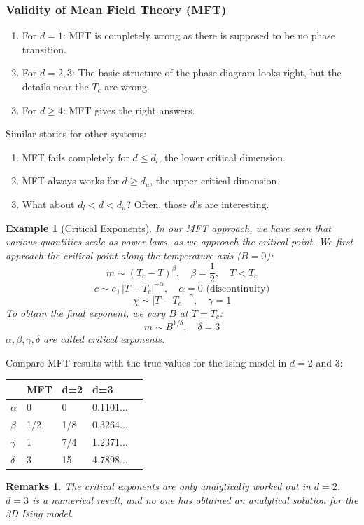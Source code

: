 \documentclass[a4paper]{article}
\newtheorem{remarks}{Remarks}[section]
\newtheorem{eg}{Example}[section]
\theoremstyle{new}
\begin{document}
\subsubsection{Validity of Mean Field Theory (MFT)}
\begin{enumerate}
    \item For $d=1$: MFT is completely wrong as there is supposed to be no phase transition.
    \item For $d=2,3$: The basic structure of the phase diagram looks right, but the details near the $T_c$ are wrong.
    \item For $d\geq4$: MFT gives the right answers.
\end{enumerate}
Similar stories for other systems:
\begin{enumerate}
    \item MFT fails completely for $d\leq d_l$, the lower critical dimension.
    \item MFT always works for $d\geq d_u$, the upper critical dimension.
    \item What about $d_l<d<d_u$? Often, those $d$'s are interesting.
\end{enumerate}
\begin{eg}[Critical Exponents]
In our MFT approach, we have seen that various quantities scale as power laws, as we approach the critical point. We first approach the critical point along the temperature axis ($B=0$):
$$m\sim(T_c-T)^\beta,\quad\beta=\frac{1}{2},\quad T<T_c$$
$$c\sim c_\pm|T-T_c|^{-\alpha},\quad\alpha=0\text{ (discontinuity)}$$
$$\chi\sim|T-T_c|^{-\gamma},\quad\gamma=1$$
To obtain the final exponent, we vary $B$ at $T=T_c$:
$$m\sim B^{1/\delta},\quad\delta=3$$
$\alpha,\beta,\gamma,\delta$ are called critical exponents.
\end{eg}
Compare MFT results with the true values for the Ising model in $d=2$ and 3:
\begin{table}[H]
\centering
\begin{tabular}{|l|l|l|l|l|}
\hline
      & MFT & d=2 & d=3         \\
      \hline
$\alpha$ & 0   & 0   & 0.1101...   \\
 \hline
$\beta$  & 1/2 & 1/8 & 0.3264...   \\
 \hline
$\gamma$ & 1   & 7/4 & 1.2371...   \\
 \hline
$\delta$ & 3   & 15  & 4.7898...  \\
\hline
\end{tabular}
\end{table}
\begin{remarks}
The critical exponents are only analytically worked out in $d=2$. $d=3$ is a numerical result, and no one has obtained an analytical solution for the 3D Ising model.
\end{remarks}
\end{document}
